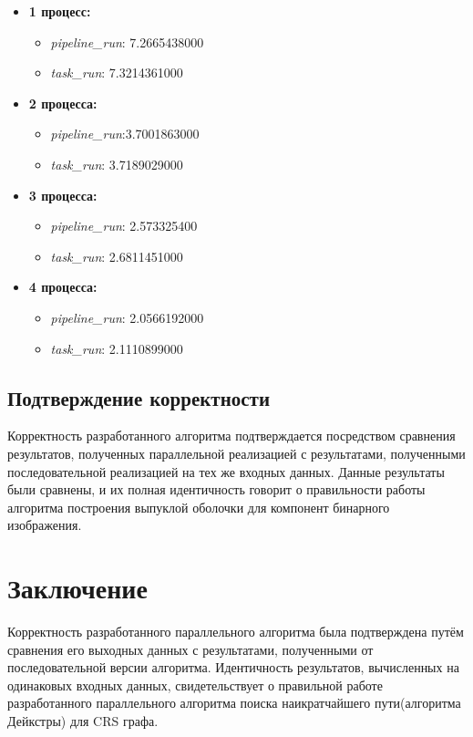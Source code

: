 \documentclass[12pt]{article}
\begin{document}
\begin{itemize}
    \item \textbf{1 процесс:}
        \begin{itemize}
            \item \textit{pipeline\_run}: 7.2665438000
            \item \textit{task\_run}:  7.3214361000
        \end{itemize}
    \item \textbf{2 процесса:}
        \begin{itemize}
            \item \textit{pipeline\_run}:3.7001863000
            \item \textit{task\_run}: 3.7189029000
        \end{itemize}
     \item \textbf{3 процесса:}
        \begin{itemize}
            \item \textit{pipeline\_run}: 2.573325400
             \item \textit{task\_run}:  2.6811451000
        \end{itemize}
     \item \textbf{4 процесса:}
        \begin{itemize}
             \item \textit{pipeline\_run}: 2.0566192000
            \item \textit{task\_run}: 2.1110899000
        \end{itemize}
\end{itemize}

\subsection*{Подтверждение корректности}
\label{subsec:correctness_verification}
Корректность разработанного алгоритма подтверждается посредством сравнения результатов, полученных параллельной реализацией с результатами, полученными последовательной реализацией на тех же входных данных. Данные результаты были сравнены, и их полная идентичность говорит о правильности работы алгоритма построения выпуклой оболочки для компонент бинарного изображения.


\section*{Заключение}
Корректность разработанного параллельного алгоритма была подтверждена путём сравнения его выходных данных с результатами, полученными от последовательной версии алгоритма. Идентичность результатов, вычисленных на одинаковых входных данных, свидетельствует о правильной работе разработанного параллельного алгоритма поиска наикратчайшего пути(алгоритма Дейкстры) для CRS графа.
\newpage
\end{document}
